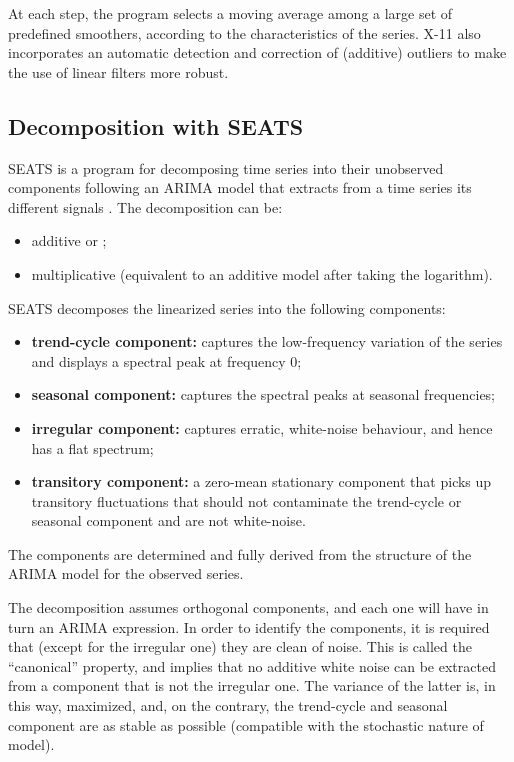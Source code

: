 \documentclass[article]{jss}
\providecommand{\tightlist}{%
  \setlength{\itemsep}{0pt}\setlength{\parskip}{0pt}}
\begin{document}
At each step, the program selects a moving average among a large set of
predefined smoothers, according to the characteristics of the series.
X-11 also incorporates an automatic detection and correction of
(additive) outliers to make the use of linear filters more robust.

\hypertarget{sa-seats}{%
\subsection{Decomposition with SEATS}\label{sa-seats}}

SEATS is a program for decomposing time series into their unobserved
components following an ARIMA model that extracts from a time series its
different signals \citep{gomez1996programs, caporello2004program}. The
decomposition can be:

\begin{itemize}
\tightlist
\item
  additive or ;
\item
  multiplicative (equivalent to an additive model after taking the
  logarithm).
\end{itemize}

SEATS decomposes the linearized series into the following components:

\begin{itemize}
\tightlist
\item
  \textbf{trend-cycle component:} captures the low-frequency variation
  of the series and displays a spectral peak at frequency 0;\\
\item
  \textbf{seasonal component:} captures the spectral peaks at seasonal
  frequencies;\\
\item
  \textbf{irregular component:} captures erratic, white-noise behaviour,
  and hence has a flat spectrum;\\
\item
  \textbf{transitory component:} a zero-mean stationary component that
  picks up transitory fluctuations that should not contaminate the
  trend-cycle or seasonal component and are not white-noise.
\end{itemize}

The components are determined and fully derived from the structure of
the ARIMA model for the observed series.

The decomposition assumes orthogonal components, and each one will have
in turn an ARIMA expression. In order to identify the components, it is
required that (except for the irregular one) they are clean of noise.
This is called the ``canonical'' property, and implies that no additive
white noise can be extracted from a component that is not the irregular
one. The variance of the latter is, in this way, maximized, and, on the
contrary, the trend-cycle and seasonal component are as stable as
possible (compatible with the stochastic nature of model).
\end{document}
